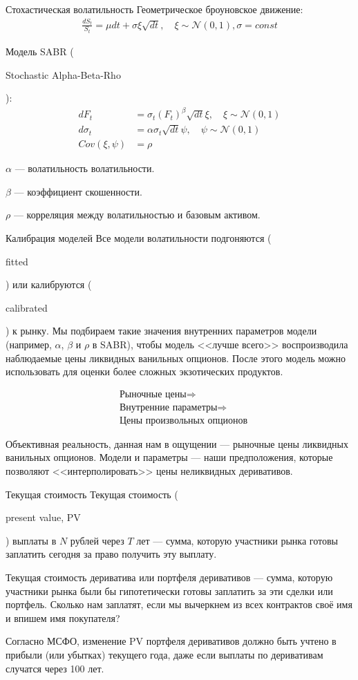 \documentclass{beamer}
\newcommand{\en}[1]{\begin{otherlanguage}{english}#1\end{otherlanguage}}
\begin{document}
\begin{frame}{Стохастическая волатильность}
\justify
Геометрическое броуновское движение:
\begin{align*}
\frac{dS_t}{S_t} = \mu dt + \sigma\xi\sqrt{dt}, \quad \xi \sim \mathcal{N}(0, 1), \sigma = const
\end{align*}

\justify
Модель SABR (\en{Stochastic Alpha-Beta-Rho}):
\begin{align*}
dF_t &= \sigma_t(F_t)^\beta \sqrt{dt}\xi, \quad \xi \sim \mathcal{N}(0, 1) \\
d\sigma_t &= \alpha\sigma_t\sqrt{dt}\psi, \quad \psi \sim \mathcal{N}(0, 1) \\
Cov(\xi, \psi) &= \rho
\end{align*}

\justify
$\alpha$ --- волатильность волатильности.

$\beta$ --- коэффициент скошенности.

$\rho$ --- корреляция между волатильностью и базовым активом.
\end{frame}



\begin{frame}{Калибрация моделей}
\justify
Все модели волатильности подгоняются (\en{fitted}) или калибруются (\en{calibrated}) к рынку. Мы подбираем такие значения внутренних параметров модели (например, $\alpha$, $\beta$ и $\rho$ в SABR), чтобы модель <<лучше всего>> воспроизводила наблюдаемые цены ликвидных ванильных опционов. После этого модель можно использовать для оценки более сложных экзотических продуктов.

\begin{align*}
&\text{Рыночные цены} \Rightarrow \\
&\text{Внутренние параметры} \Rightarrow \\
&\text{Цены произвольных опционов}
\end{align*}

\justify
Объективная реальность, данная нам в ощущении --- рыночные цены ликвидных ванильных опционов. Модели и параметры --- наши предположения, которые позволяют <<интерполировать>> цены неликвидных деривативов.
\end{frame}



\begin{frame}{Текущая стоимость}
\justify
Текущая стоимость (\en{present value, PV}) выплаты в $N$ рублей через $T$ лет 
--- сумма, которую участники рынка готовы заплатить сегодня за право получить эту 
выплату.

\justify
Текущая стоимость дериватива или портфеля деривативов --- сумма, которую участники рынка были бы гипотетически готовы заплатить за эти сделки или портфель. Сколько нам заплатят, если мы вычеркнем из всех контрактов своё имя и впишем имя покупателя?

\justify
Согласно МСФО, изменение PV портфеля деривативов должно быть учтено в прибыли (или убытках) текущего года, даже если выплаты по деривативам случатся через 100 лет.
\end{frame}
\end{document}

